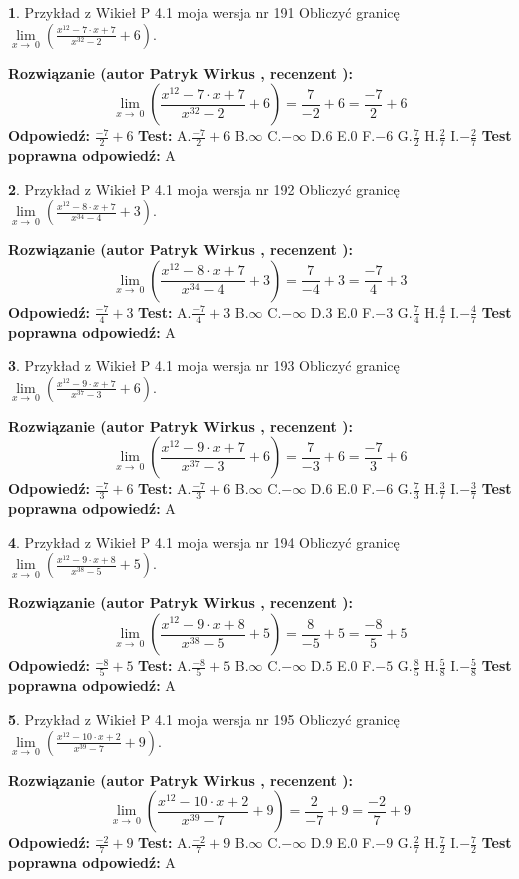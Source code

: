 \documentclass[12pt, a4paper]{article}
\theoremstyle{definition} %
\newtheorem{zad}{}
\newcommand{\zadStart}[1]{\begin{zad}#1\newline}
\newcommand{\zadStop}{\end{zad}}
\newcommand{\rozwStart}[2]{\noindent \textbf{Rozwiązanie (autor #1 , recenzent #2): }\newline}
\newcommand{\rozwStop}{\newline}
\newcommand{\odpStart}{\noindent \textbf{Odpowiedź:}\newline}
\newcommand{\odpStop}{\newline}
\newcommand{\testStart}{\noindent \textbf{Test:}\newline}
\newcommand{\testStop}{\newline}
\newcommand{\kluczStart}{\noindent \textbf{Test poprawna odpowiedź:}\newline}
\newcommand{\kluczStop}{\newline}
\begin{document}
\zadStart{Przykład z Wikieł P 4.1 moja wersja nr 191}
Obliczyć granicę $\lim\limits_{x\to\ 0}(\frac{x^{12}-7 \cdot x +7}{x^{32}-2}+6)$.
\zadStop
\rozwStart{Patryk Wirkus}{}
$$\lim\limits_{x\to\ 0}(\frac{x^{12}-7 \cdot x +7}{x^{32}-2}+6)=\frac{7}{-2}+6=\frac{-7}{2}+6$$
\rozwStop
\odpStart
$\frac{-7}{2}+6$
\odpStop
\testStart
A.$\frac{-7}{2}+6$
B.$\infty$
C.$-\infty$
D.$6$
E.$0$
F.$-6$
G.$\frac{7}{2}$
H.$\frac{2}{7}$
I.$-\frac{2}{7}$
\testStop
\kluczStart
A
\kluczStop



\zadStart{Przykład z Wikieł P 4.1 moja wersja nr 192}
Obliczyć granicę $\lim\limits_{x\to\ 0}(\frac{x^{12}-8 \cdot x +7}{x^{34}-4}+3)$.
\zadStop
\rozwStart{Patryk Wirkus}{}
$$\lim\limits_{x\to\ 0}(\frac{x^{12}-8 \cdot x +7}{x^{34}-4}+3)=\frac{7}{-4}+3=\frac{-7}{4}+3$$
\rozwStop
\odpStart
$\frac{-7}{4}+3$
\odpStop
\testStart
A.$\frac{-7}{4}+3$
B.$\infty$
C.$-\infty$
D.$3$
E.$0$
F.$-3$
G.$\frac{7}{4}$
H.$\frac{4}{7}$
I.$-\frac{4}{7}$
\testStop
\kluczStart
A
\kluczStop



\zadStart{Przykład z Wikieł P 4.1 moja wersja nr 193}
Obliczyć granicę $\lim\limits_{x\to\ 0}(\frac{x^{12}-9 \cdot x +7}{x^{37}-3}+6)$.
\zadStop
\rozwStart{Patryk Wirkus}{}
$$\lim\limits_{x\to\ 0}(\frac{x^{12}-9 \cdot x +7}{x^{37}-3}+6)=\frac{7}{-3}+6=\frac{-7}{3}+6$$
\rozwStop
\odpStart
$\frac{-7}{3}+6$
\odpStop
\testStart
A.$\frac{-7}{3}+6$
B.$\infty$
C.$-\infty$
D.$6$
E.$0$
F.$-6$
G.$\frac{7}{3}$
H.$\frac{3}{7}$
I.$-\frac{3}{7}$
\testStop
\kluczStart
A
\kluczStop



\zadStart{Przykład z Wikieł P 4.1 moja wersja nr 194}
Obliczyć granicę $\lim\limits_{x\to\ 0}(\frac{x^{12}-9 \cdot x +8}{x^{38}-5}+5)$.
\zadStop
\rozwStart{Patryk Wirkus}{}
$$\lim\limits_{x\to\ 0}(\frac{x^{12}-9 \cdot x +8}{x^{38}-5}+5)=\frac{8}{-5}+5=\frac{-8}{5}+5$$
\rozwStop
\odpStart
$\frac{-8}{5}+5$
\odpStop
\testStart
A.$\frac{-8}{5}+5$
B.$\infty$
C.$-\infty$
D.$5$
E.$0$
F.$-5$
G.$\frac{8}{5}$
H.$\frac{5}{8}$
I.$-\frac{5}{8}$
\testStop
\kluczStart
A
\kluczStop



\zadStart{Przykład z Wikieł P 4.1 moja wersja nr 195}
Obliczyć granicę $\lim\limits_{x\to\ 0}(\frac{x^{12}-10 \cdot x +2}{x^{39}-7}+9)$.
\zadStop
\rozwStart{Patryk Wirkus}{}
$$\lim\limits_{x\to\ 0}(\frac{x^{12}-10 \cdot x +2}{x^{39}-7}+9)=\frac{2}{-7}+9=\frac{-2}{7}+9$$
\rozwStop
\odpStart
$\frac{-2}{7}+9$
\odpStop
\testStart
A.$\frac{-2}{7}+9$
B.$\infty$
C.$-\infty$
D.$9$
E.$0$
F.$-9$
G.$\frac{2}{7}$
H.$\frac{7}{2}$
I.$-\frac{7}{2}$
\testStop
\kluczStart
A
\kluczStop
\end{document}

